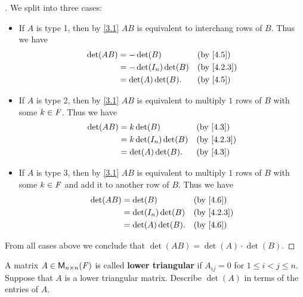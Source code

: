 \begin{proof}[]
  We split into three cases:
  \begin{itemize}
    \item If \(A\) is type 1, then by \cref{3.1} \(AB\) is equivalent to interchang rows of \(B\).
          Thus we have
          \begin{align*}
            \det(AB) & = -\det(B)           &  & \by{4.5}   \\
                     & = -\det(I_n) \det(B) &  & \by{4.2.3} \\
                     & = \det(A) \det(B).   &  & \by{4.5}
          \end{align*}
    \item If \(A\) is type 2, then by \cref{3.1} \(AB\) is equivalent to multiply \(1\) rows of \(B\) with some \(k \in \mathit{F}\).
          Thus we have
          \begin{align*}
            \det(AB) & = k \det(B)           &  & \by{4.3}   \\
                     & = k \det(I_n) \det(B) &  & \by{4.2.3} \\
                     & = \det(A) \det(B).    &  & \by{4.3}
          \end{align*}
    \item If \(A\) is type 3, then by \cref{3.1} \(AB\) is equivalent to multiply \(1\) rows of \(B\) with some \(k \in \mathit{F}\) and add it to another row of \(B\).
          Thus we have
          \begin{align*}
            \det(AB) & = \det(B)           &  & \by{4.6}   \\
                     & = \det(I_n) \det(B) &  & \by{4.2.3} \\
                     & = \det(A) \det(B).  &  & \by{4.6}
          \end{align*}
  \end{itemize}
  From all cases above we conclude that \(\det(AB) = \det(A) \cdot \det(B)\).
\end{proof}

\begin{ex}\label{ex:4.3.19}
  A matrix \(A \in \ms[n][n][\F]\) is called \textbf{lower triangular} if \(A_{i j} = 0\) for \(1 \leq i < j \leq n\).
  Suppose that \(A\) is a lower triangular matrix.
  Describe \(\det(A)\) in terms of the entries of \(A\).
\end{ex}

